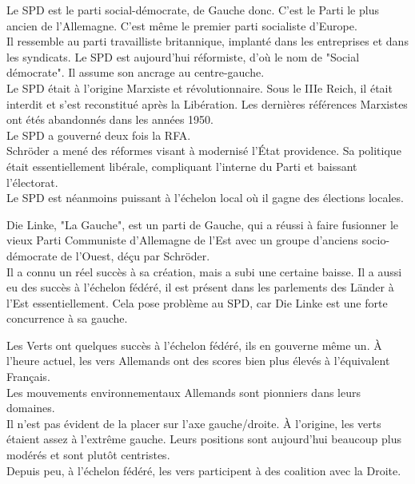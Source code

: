 \documentclass[10pt, a4paper, openany]{book}
\begin{document}
Le SPD est le parti social-démocrate, de Gauche donc. C'est le Parti le plus ancien de l'Allemagne. C'est même le premier parti socialiste d'Europe. \\
Il ressemble au parti travailliste britannique, implanté dans les entreprises et dans les syndicats. Le SPD est aujourd'hui réformiste, d'où le nom de "Social démocrate". Il assume son ancrage au centre-gauche. \\
Le SPD était à l'origine Marxiste et révolutionnaire. Sous le IIIe Reich, il était interdit et s'est reconstitué après la Libération. Les dernières références Marxistes ont étés abandonnés dans les années 1950. \\
Le SPD a gouverné deux fois la RFA. \\
Schröder a mené des réformes visant à modernisé l'État providence. Sa politique était essentiellement libérale, compliquant l'interne du Parti et baissant l'électorat. \\
Le SPD est néanmoins puissant à l'échelon local où il gagne des élections locales. 


Die Linke, "La Gauche", est un parti de Gauche, qui a réussi à faire fusionner le vieux Parti Communiste d'Allemagne de l'Est avec un groupe d'anciens socio-démocrate de l'Ouest, déçu par Schröder. \\
Il a connu un réel succès à sa création, mais a subi une certaine baisse. Il a aussi eu des succès à l'échelon fédéré, il est présent dans les parlements des Länder à l'Est essentiellement. Cela pose problème au SPD, car Die Linke est une forte concurrence à sa gauche. 


Les Verts ont quelques succès à l'échelon fédéré, ils en gouverne même un. À l'heure actuel, les vers Allemands ont des scores bien plus élevés à l'équivalent Français. \\
Les mouvements environnementaux Allemands sont pionniers dans leurs domaines. \\
Il n'est pas évident de la placer sur l'axe gauche/droite. À l'origine, les verts étaient assez à l'extrême gauche. Leurs positions sont aujourd'hui beaucoup plus modérés et sont plutôt centristes. \\
Depuis peu, à l'échelon fédéré, les vers participent à des coalition avec la Droite. 
\end{document}
